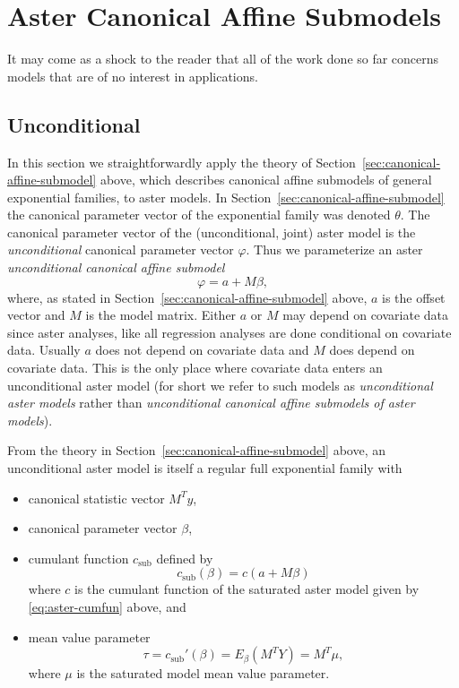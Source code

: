 \section{Aster Canonical Affine Submodels}
\label{sec:canonical-affine-submodels}

It may come as a shock to the reader that all of the work done so far
concerns models that are of no interest in applications.

\subsection{Unconditional}

In this section we straightforwardly apply the theory
of Section~\ref{sec:canonical-affine-submodel} above,
which describes canonical affine submodels of general exponential families,
to aster models.  In Section~\ref{sec:canonical-affine-submodel} the canonical
parameter vector of the exponential family was denoted $\theta$.
The canonical parameter vector of the (unconditional, joint) aster model
is the \emph{unconditional} canonical parameter vector $\varphi$.
Thus we parameterize an aster \emph{unconditional canonical affine submodel}
\begin{equation} \label{eq:affine-unconditional}
   \varphi = a + M \beta,
\end{equation}
where, as stated in Section~\ref{sec:canonical-affine-submodel} above,
$a$ is the offset vector and $M$ is the model matrix.
Either $a$ or $M$ may depend on covariate data since aster analyses,
like all regression analyses are done conditional on covariate data.
Usually $a$ does not depend on covariate data and $M$ does depend
on covariate data.
This is the only place where covariate data enters
an unconditional aster model (for short we refer to such models
as \emph{unconditional aster models} rather than
\emph{unconditional canonical affine submodels of aster models}).

From the theory in Section~\ref{sec:canonical-affine-submodel} above,
an unconditional aster model is itself a regular full exponential family
with
\begin{itemize}
\item canonical statistic vector $M^T y$,
\item canonical parameter vector $\beta$,
\item cumulant function $c_\text{sub}$ defined by
$$
   c_\text{sub}(\beta) = c(a + M \beta)
$$
where $c$ is the cumulant function of the saturated aster model given by
\eqref{eq:aster-cumfun} above, and
\item mean value parameter
$$
   \tau = c_\text{sub}'(\beta) = E_\beta(M^T Y) = M^T \mu,
$$
where $\mu$ is the saturated model mean value parameter.
\end{itemize}

